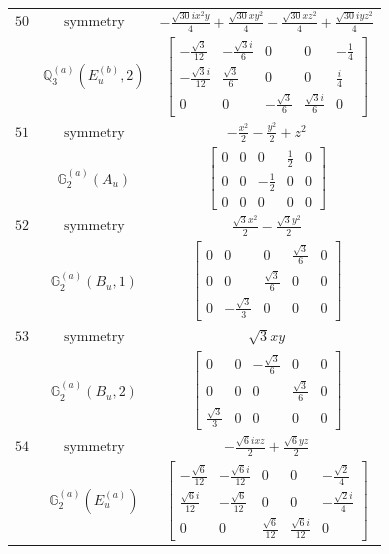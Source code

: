 \documentclass[fleqn,8pt,landscape]{jsarticle}
\begin{document}
\begin{longtable}{ccc}
$ 50 $ & $ \text{symmetry} $ & $ - \frac{\sqrt{30} i x^{2} y}{4} + \frac{\sqrt{30} x y^{2}}{4} - \frac{\sqrt{30} x z^{2}}{4} + \frac{\sqrt{30} i y z^{2}}{4} $ \\
$  $ & $ \mathbb{Q}_{3}^{(a)}(E_{u}^{(b)},2) $ & $ \begin{bmatrix} - \frac{\sqrt{3}}{12} & - \frac{\sqrt{3} i}{6} & 0 & 0 & - \frac{1}{4} \\ - \frac{\sqrt{3} i}{12} & \frac{\sqrt{3}}{6} & 0 & 0 & \frac{i}{4} \\ 0 & 0 & - \frac{\sqrt{3}}{6} & \frac{\sqrt{3} i}{6} & 0 \end{bmatrix} $ \\ \hline
$ 51 $ & $ \text{symmetry} $ & $ - \frac{x^{2}}{2} - \frac{y^{2}}{2} + z^{2} $ \\
$  $ & $ \mathbb{G}_{2}^{(a)}(A_{u}) $ & $ \begin{bmatrix} 0 & 0 & 0 & \frac{1}{2} & 0 \\ 0 & 0 & - \frac{1}{2} & 0 & 0 \\ 0 & 0 & 0 & 0 & 0 \end{bmatrix} $ \\ \hline
$ 52 $ & $ \text{symmetry} $ & $ \frac{\sqrt{3} x^{2}}{2} - \frac{\sqrt{3} y^{2}}{2} $ \\
$  $ & $ \mathbb{G}_{2}^{(a)}(B_{u},1) $ & $ \begin{bmatrix} 0 & 0 & 0 & \frac{\sqrt{3}}{6} & 0 \\ 0 & 0 & \frac{\sqrt{3}}{6} & 0 & 0 \\ 0 & - \frac{\sqrt{3}}{3} & 0 & 0 & 0 \end{bmatrix} $ \\ \hline
$ 53 $ & $ \text{symmetry} $ & $ \sqrt{3} x y $ \\
$  $ & $ \mathbb{G}_{2}^{(a)}(B_{u},2) $ & $ \begin{bmatrix} 0 & 0 & - \frac{\sqrt{3}}{6} & 0 & 0 \\ 0 & 0 & 0 & \frac{\sqrt{3}}{6} & 0 \\ \frac{\sqrt{3}}{3} & 0 & 0 & 0 & 0 \end{bmatrix} $ \\ \hline
$ 54 $ & $ \text{symmetry} $ & $ - \frac{\sqrt{6} i x z}{2} + \frac{\sqrt{6} y z}{2} $ \\
$  $ & $ \mathbb{G}_{2}^{(a)}(E_{u}^{(a)}) $ & $ \begin{bmatrix} - \frac{\sqrt{6}}{12} & - \frac{\sqrt{6} i}{12} & 0 & 0 & - \frac{\sqrt{2}}{4} \\ \frac{\sqrt{6} i}{12} & - \frac{\sqrt{6}}{12} & 0 & 0 & - \frac{\sqrt{2} i}{4} \\ 0 & 0 & \frac{\sqrt{6}}{12} & \frac{\sqrt{6} i}{12} & 0 \end{bmatrix} $ \\ \hline

\end{longtable}
\end{document}
